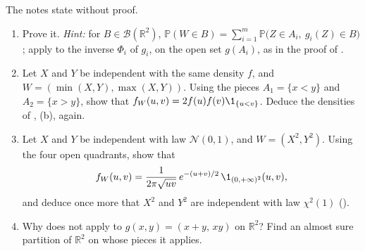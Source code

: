 \begin{exercise}\label{ex:rv-piecewise}
\medium The notes state  without proof.
\begin{enumerate}[label=(\alph*)]
  \item Prove it. \emph{Hint:} for $B\in\mathcal B(\mathbb R^2)$,
    $\mathbb P(W\in B)=\sum_{i=1}^m\mathbb P\big(Z\in A_i,\ g_i(Z)\in B\big)$; apply
     to the inverse $\Phi_i$ of $g_i$, on the open set $g(A_i)$, as in the
    proof of .
  \item Let $X$ and $Y$ be independent with the same density $f$, and $W=(\min(X,Y),\max(X,Y))$.
    Using the pieces $A_1=\{x<y\}$ and $A_2=\{x>y\}$, show that
    $f_W(u,v)=2f(u)f(v)\1_{\{u<v\}}$. Deduce the densities of , (b), again.
  \item Let $X$ and $Y$ be independent with law $\mathcal N(0,1)$, and $W=(X^2,Y^2)$. Using the four
    open quadrants, show that
    \[
      f_W(u,v)=\frac1{2\pi\sqrt{uv}}\,e^{-(u+v)/2}\,\1_{(0,+\infty)^2}(u,v),
    \]
    and deduce once more that $X^2$ and $Y^2$ are independent with law $\chi^2(1)$
    ().
  \item Why does  not apply to $g(x,y)=(x+y,\,xy)$ on $\mathbb R^2$? Find an
    almost sure partition of $\mathbb R^2$ on whose pieces it applies.
\end{enumerate}
\end{exercise}

